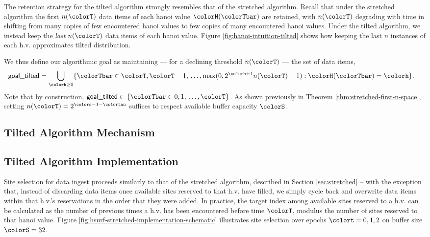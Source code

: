 

The retention strategy for the tilted algorithm strongly resembles that of the stretched algorithm.
Recall that under the stretched algorithm the first $n(\colorT)$ data items of each hanoi value $\colorH(\colorTbar)$ are retained, with $n(\colorT)$ degrading with time in shifting from many copies of few encountered hanoi values to few copies of many encountered hanoi values.
Under the tilted algorithm, we instead keep the \textit{last} $n(\colorT)$ data items of each hanoi value.
Figure \ref{fig:hanoi-intuition-tilted} shows how keeping the last $n$ instances of each h.v. approximates tilted distribution.

We thus define our algorithmic goal as maintaining --- for a declining threshold $n(\colorT)$ --- the set of data items,
\begin{align*}
\textsf{goal\_tilted}
&=
\bigcup_{\colorh \geq 0}
\{ \colorTbar \in \colorT, \colorT - 1, \, \ldots, \max(0, 2^{\colorh + 1}n(\colorT) - 1) : \colorH(\colorTbar) = \colorh \}.
\end{align*}
Note that by construction, $\textsf{goal\_tilted} \subset \{ \colorTbar \in 0, 1, \, \ldots, \colorT \}$.
As shown previously in Theorem \ref{thm:stretched-first-n-space}, setting $n(\colorT) = 2^{\colors - 1 - \colortau}$ suffices to respect available buffer capacity $\colorS$.

\subsection{Tilted Algorithm Mechanism}
\label{sec:tilted-mechanism}











\subsection{Tilted Algorithm Implementation}
\label{sec:tilted-implementation}



Site selection for data ingest proceeds similarly to that of the stretched algorithm, described in Section \ref{sec:stretched} -- with the exception that, instead of discarding data items once available sites reserved to that h.v. have filled, we simply cycle back and overwrite data items within that h.v.'s reservations in the order that they were added.
In practice, the target index among available sites reserved to a h.v. can be calculated as the number of previous times a h.v. has been encountered before time $\colorT$, modulus the number of sites reserved to that hanoi value.
Figure \ref{fig:hsurf-stretched-implementation-schematic} illustrates site selection over epochs $\colort=0,1,2$ on buffer size $\colorS=32$.

